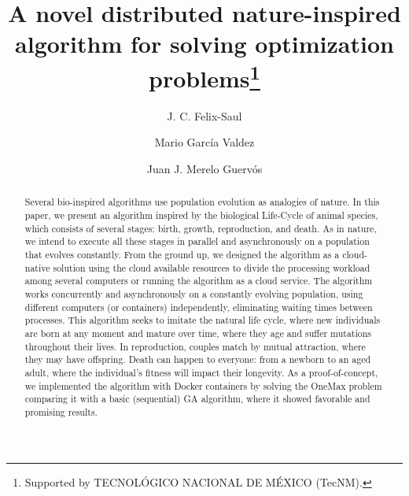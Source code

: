 \documentclass[runningheads]{llncs}
\begin{document}
%
\title{A novel distributed nature-inspired algorithm for solving optimization problems\thanks{Supported by TECNOLÓGICO NACIONAL DE MÉXICO (TecNM).}}
%
%
\author{J. C. Felix-Saul  \and
Mario García Valdez \and
Juan J. Merelo Guervós}
%
%
%
\maketitle              %
%
\begin{abstract}

Several bio-inspired algorithms use population evolution as analogies of
nature. In this paper, we present an algorithm inspired by the biological
Life-Cycle of animal species, which consists of several stages: birth, growth,
reproduction, and death. As in nature, we intend to execute all these stages in
parallel and asynchronously on a population that evolves constantly. From the
ground up, we designed the algorithm as a cloud-native solution using the cloud
available resources to divide the processing workload among several computers
or running the algorithm as a cloud service. The algorithm works concurrently
and asynchronously on a constantly evolving population, using different
computers (or containers) independently, eliminating waiting times between
processes. This algorithm seeks to imitate the natural life cycle, where new
individuals are born at any moment and mature over time, where they age and
suffer mutations throughout their lives. In reproduction, couples match by
mutual attraction, where they may have offspring. Death can happen to everyone:
from a newborn to an aged adult, where the individual's fitness will impact
their longevity. As a proof-of-concept, we implemented the algorithm with
Docker containers by solving the OneMax problem comparing it with a basic
(sequential) GA algorithm, where it showed favorable and promising results.

\end{abstract}
\end{document}
